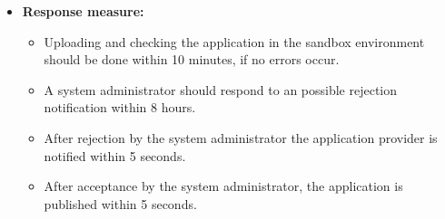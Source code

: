 \documentclass[english]{sareport}
\begin{document}
\begin{itemize}
    \item \textbf{Response measure:}
        \begin{itemize}
            \item Uploading and checking the application in the sandbox environment should be done within 10 minutes, if no errors occur.
            \item A system administrator should respond to an possible rejection notification within 8 hours.
            \item After rejection by the system administrator the application provider is notified within 5 seconds.
            \item After acceptance by the system administrator, the application is published within 5 seconds.
        \end{itemize}
\end{itemize}
\end{document}
